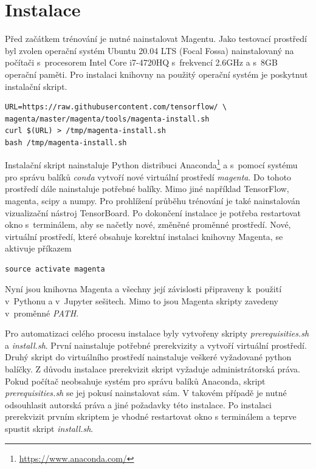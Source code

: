 \section{Instalace}
Před začátkem trénování je nutné nainstalovat Magentu.
Jako testovací prostředí byl zvolen operační systém Ubuntu 20.04 LTS (Focal Fossa)
nainstalovaný na počítači s~procesorem Intel Core i7-4720HQ s~frekvencí 2.6GHz
a s~8GB operační paměti. 
Pro instalaci knihovny na použitý operační systém je poskytnut instalační skript.

\begin{verbatim}
URL=https://raw.githubusercontent.com/tensorflow/ \
magenta/master/magenta/tools/magenta-install.sh
curl $(URL) > /tmp/magenta-install.sh
bash /tmp/magenta-install.sh    
\end{verbatim}
Instalační skript nainstaluje Python distribuci Anaconda\footnote{\url{https://www.anaconda.com/}}
a s~pomocí systému pro správu balíků \emph{conda} vytvoří nové virtuální prostředí \emph{magenta}.
Do tohoto prostředí dále nainstaluje potřebné balíky.
Mimo jiné například TensorFlow, magenta, scipy a numpy.
Pro prohlížení průběhu trénování je také nainstalován vizualizační nástroj TensorBoard.
Po dokončení instalace je potřeba restartovat okno s~terminálem,
aby se načetly nové, změněné proměnné prostředí.
Nové, virtuální prostředí, které obsahuje korektní instalaci knihovny Magenta,
se aktivuje příkazem

\begin{verbatim}
source activate magenta
\end{verbatim}
Nyní jsou knihovna Magenta a všechny její závislosti 
připraveny k~použití v~Pythonu a v~Jupyter sešitech.
Mimo to jsou Magenta skripty zavedeny v~proměnné \emph{PATH}.
\cite{google_git_polyphony}
\par

Pro automatizaci celého procesu instalace byly vytvořeny skripty 
\emph{prerequisities.sh} a \emph{install.sh}.
První nainstaluje potřebné prerekvizity a
vytvoří virtuální prostředí.
Druhý skript do virtuálního prostředí nainstaluje veškeré vyžadované python balíčky.
Z důvodu instalace prerekvizit skript vyžaduje administrátorská práva.
Pokud počítač neobsahuje systém pro správu balíků Anaconda,
skript \emph{prerequisities.sh} se jej pokusí nainstalovat sám.
V takovém případě je nutné odsouhlasit autorská práva 
a jiné požadavky této instalace.
Po instalaci prerekvizit prvním skriptem je vhodné restartovat okno s terminálem
a teprve spustit skript \emph{install.sh}.

